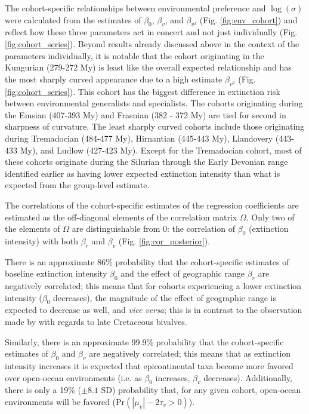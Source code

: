 \documentclass{article}
\begin{document}
The cohort-specific relationships between environmental preference and \(\log(\sigma)\) were calculated from the estimates of \(\beta_{0}\), \(\beta_{v}\), and \(\beta_{v^{2}}\) (Fig. \ref{fig:env_cohort}) and reflect how these three parameters act in concert and not just individually (Fig. \ref{fig:cohort_series}). Beyond results already discussed above in the context of the parameters individually, it is notable that the cohort originating in the Kungurian (279-272 My) is least like the overall expected relationship and has the most sharply curved appearance due to a high estimate \(\beta_{v^{2}}\) (Fig. \ref{fig:cohort_series}). This cohort has the biggest difference in extinction risk between environmental generalists and specialists. The cohorts originating during the Emsian (407-393 My) and Frasnian (382 - 372 My) are tied for second in sharpness of curvature. The least sharply curved cohorts include those originating during Tremadocian (484-477 My), Hirnantian (445-443 My), Llandovery (443-433 My), and Ludlow (427-423 My). Except for the Tremadocian cohort, most of these cohorts originate during the Silurian through the Early Devonian range identified earlier as having lower expected extinction intensity than what is expected from the group-level estimate.

The correlations of the cohort-specific estimates of the regression coefficients are estimated as the off-diagonal elements of the correlation matrix \(\Omega\). Only two of the elements of \(\Omega\) are distinguishable from 0: the correlation of \(\beta_{0}\) (extinction intensity) with both \(\beta_{r}\) and \(\beta_{v}\) (Fig. \ref{fig:cor_posterior}). 

There is an approximate 86\% probability that the cohort-specific estimates of baseline extinction intensity \(\beta_{0}\) and the effect of geographic range \(\beta_{r}\) are negatively correlated; this means that for cohorts experiencing a lower extinction intensity (\(\beta_{0}\) decreases), the magnitude of the effect of geographic range is expected to decrease as well, and \textit{vice versa}; this is in contrast to the observation made by \citet{Jablonski1986} with regards to late Cretaceous bivalves.

Similarly, there is an approximate 99.9\% probability that the cohort-specific estimates of \(\beta_{0}\) and \(\beta_{v}\) are negatively correlated; this means that as extinction intensity increases it is expected that epicontinental taxa become more favored over open-ocean environments (i.e. as \(\beta_{0}\) increases, \(\beta_{v}\) decreases). Additionally, there is only a 19\% (\(\pm 8.1\) SD) probability that, for any given cohort, open-ocean environments will be favored (\(\mathrm{Pr}\left(|\mu_{v}| - 2\tau_{v} > 0\right)\)).
\end{document}
